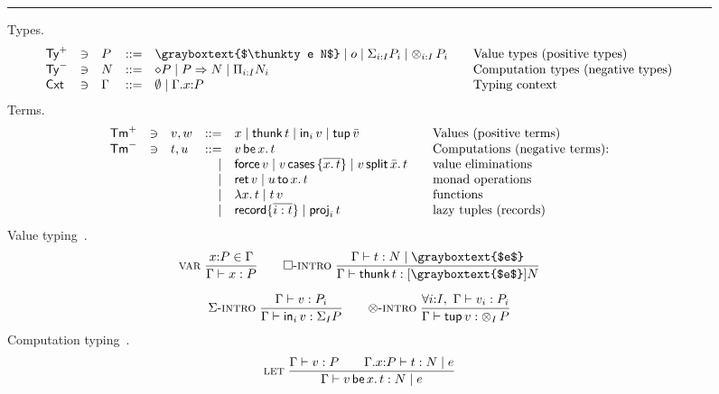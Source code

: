\documentclass[acmsmall,review,anonymous]{acmart}\settopmatter{printfolios=true,printccs=false,printacmref=false}
\newcommand{\dashruler}{\hdashrule[0.5ex]{\textwidth}{0.2pt}{1ex}}
\newcommand{\ruler}{\rule{\textwidth}{0.2pt}}
\newcommand{\graybox}[1]{\grayboxtext{$#1$}}
\begin{document}
\begin{figure}[htbp]
\flushleft
\ruler{}
Types.
\[
\begin{array}{lllrl@{\qquad}l}
\PTy & \ni & P
  & ::= & \graybox{\thunkty e N}
     \mid o \mid \sumty i I P \mid \tupty i I P
  & \mbox{Value types (positive types)} \\
\NTy & \ni & N
  & ::= & \diamond P
     \mid P \To N \mid \recty i I N
  & \mbox{Computation types (negative types)} \\
\Cxt & \ni & \Gamma
  & ::= & \cempty \mid \ext \Gamma x P
  & \mbox{Typing context}
\\
\end{array}
\]
\dashruler{}
Terms.
\[
\begin{array}{lllrl@{\qquad}l}
\PTm & \ni & v,w
  & ::= & x
     \mid \thunk t
     \mid \inj i v
     \mid \ptup{\bar v}
  & \mbox{Values (positive terms)} \\
\NTm & \ni & t,u
  & ::= &
         \vlet x v t
  & \mbox{Computations (negative terms):}
\\ &&& \mid &
        \force v
    \mid \case v {\overline{x.\,t}}
    \mid \splits v {\bar x} t
  & \mbox{value eliminations}
\\ &&& \mid &
         \ret v        \mid \bind x u t
  & \mbox{monad operations}
\\ &&& \mid &
         \lam x t      \mid \app t v
  & \mbox{functions}
\\ &&& \mid &
         \trecord\{\overline{i:t}\} %
       \mid \proj i t
  & \mbox{lazy tuples (records)}
\end{array}
\]
\dashruler{}
Value typing \,.
\begin{gather*}
 \nru{\rvar}
     {x{:}P \in \Gamma
    }{\ValTy \Gamma x P}
\qquad
 \nru{\rintro\Box}
     {\CompTy \Gamma t {\graybox e} N
    }{\ValTy \Gamma {\thunk t} {\thunkty {\graybox e} N}}
\\[1.5ex]
 \nru{\rintro\GS}
     {\ValTy \Gamma v {P_i}
    }{\ValTy \Gamma {\inj i v} {\sumt I P}}
\qquad
 \nru{\rintro\otimes}
     {\forall i{:}I, \ \ValTy \Gamma {v_i} {P_i}
    }{\ValTy \Gamma {\ptup v} {\tupt I P}}
\end{gather*}
\dashruler{}
Computation typing \fbox{$\CompTy \Gamma t {\graybox{e}} N$}\,.
\begin{gather*}
 \nru{\rlet}
     {\ValTy \Gamma v P \qquad
      \CompTy {\ext \Gamma x P} t e N
    }{\CompTy \Gamma {\vlet x v t} e N}

\end{gather*}
\end{figure}
\end{document}
